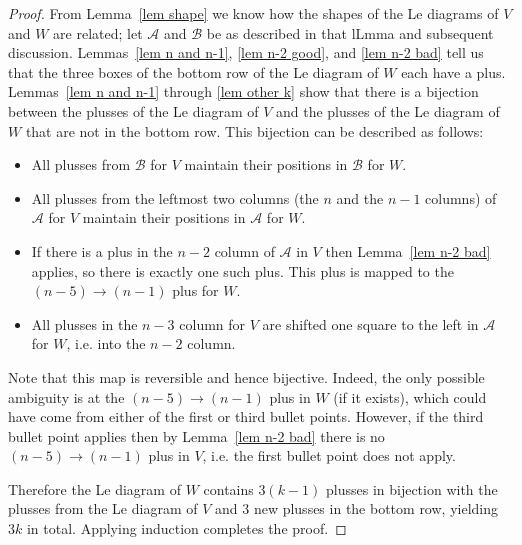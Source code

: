 \documentclass[11pt]{article}
\theoremstyle{remark}
\theoremstyle{definition}
\begin{document}
\begin{proof}
  From Lemma~\ref{lem shape} we know how the shapes of the Le diagrams of $V$ and $W$ are related; let $\mathcal{A}$ and $\mathcal{B}$ be as described in that lLmma and subsequent discussion.  Lemmas~\ref{lem n and n-1}, \ref{lem n-2 good}, and \ref{lem n-2 bad} tell us that the three boxes of the bottom row of the Le diagram of $W$ each have a plus.  Lemmas~\ref{lem n and n-1} through \ref{lem other k} show that there is a bijection between the plusses of the Le diagram of $V$ and the plusses of the Le diagram of $W$ that are not in the bottom row.  This bijection can be described as follows:
  \begin{itemize}
  \item All plusses from $\mathcal{B}$ for $V$ maintain their positions in $\mathcal{B}$ for $W$.
  \item All plusses from the leftmost two columns (the $n$ and the $n-1$ columns) of $\mathcal{A}$ for $V$ maintain their positions in $\mathcal{A}$ for $W$.
  \item If there is a plus in the $n-2$ column of $\mathcal{A}$ in $V$ then Lemma~\ref{lem n-2 bad} applies, so there is exactly one such plus.  This plus is mapped to the $(n-5)\rightarrow (n-1)$ plus for $W$.
  \item All plusses in the $n-3$ column for $V$ are shifted one square to the left in $\mathcal{A}$ for $W$, i.e. into the $n-2$ column.
  \end{itemize}
  Note that this map is reversible and hence bijective. Indeed, the only possible ambiguity is at the $(n-5)\rightarrow (n-1)$ plus in $W$ (if it exists), which could have come from either of the first or third bullet points. However, if the third bullet point applies then by Lemma~\ref{lem n-2 bad} there is no $(n-5)\rightarrow (n-1)$ plus in $V$, i.e. the first bullet point does not apply. 




Therefore the Le diagram of $W$ contains $3(k-1)$ plusses in bijection with the plusses from the Le diagram of $V$ and 3 new plusses in the bottom row, yielding $3k$ in total. Applying induction completes the proof.
\end{proof}
\end{document}
